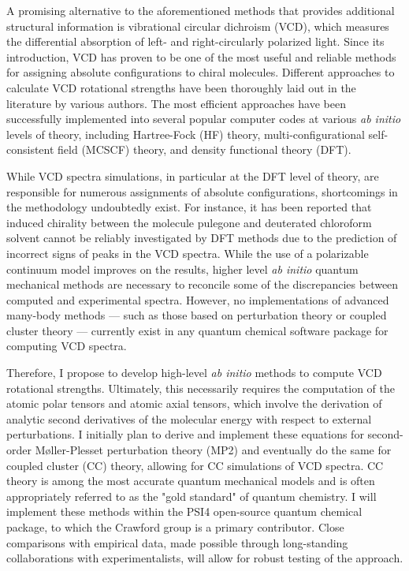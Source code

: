     A promising alternative to the aforementioned methods that provides additional structural information is vibrational circular dichroism (VCD)\cite{Stephens1985}, which measures the differential absorption of left- and right-circularly polarized light. Since its introduction, VCD has proven to be one of the most useful and reliable methods for assigning absolute configurations to chiral molecules\cite{Stephens2000}. Different approaches to calculate VCD rotational strengths have been thoroughly laid out in the literature by various authors\cite{Stephens1985,Nafie1997,Stephens2000,Bak1993,Bak1994,Amos1987}. The most efficient approaches have been successfully implemented into several popular computer codes at various \textit{ab initio} levels of theory, including Hartree-Fock (HF) theory\cite{Hartree1928,Fock1930}, multi-configurational self-consistent field (MCSCF) theory\cite{Roos1980}, and density functional theory (DFT)\cite{Hohenberg1964,Kohn1965}. 

    While VCD spectra simulations, in particular at the DFT level of theory, are responsible for numerous assignments of absolute configurations, shortcomings in the methodology undoubtedly exist. For instance, it has been reported that induced chirality between the molecule pulegone and deuterated chloroform solvent cannot be reliably investigated by DFT methods due to the prediction of incorrect signs of peaks in the VCD spectra\cite{Debie2008,Nicu2009}. While the use of a polarizable continuum model improves on the results, higher level \textit{ab initio} quantum mechanical methods are necessary to reconcile some of the discrepancies between computed and experimental spectra. However, no implementations of advanced many-body methods --- such as those based on perturbation theory\cite{Møller1934} or coupled cluster theory\cite{Coester1958,Coester1960,Cizek1966,Cizek1969,Bartlett1978,Pople1978} --- currently exist in any quantum chemical software package for computing VCD spectra.

    Therefore, I propose to develop high-level \textit{ab initio} methods to compute VCD rotational strengths. Ultimately, this necessarily requires the computation of the atomic polar tensors and atomic axial tensors, which involve the derivation of analytic second derivatives of the molecular energy with respect to external perturbations. I initially plan to derive and implement these equations for second-order M{\o}ller-Plesset perturbation theory (MP2)\cite{Møller1934} and eventually do the same for coupled cluster (CC) theory, allowing for CC simulations of VCD spectra. CC theory is among the most accurate quantum mechanical models and is often appropriately referred to as the "gold standard" of quantum chemistry\cite{Crawford2007}. I will implement these methods within the PSI4 open-source quantum chemical package\cite{Turney2012}, to which the Crawford group is a primary contributor. Close comparisons with empirical data, made possible through long-standing collaborations with experimentalists, will allow for robust testing of the approach. 
